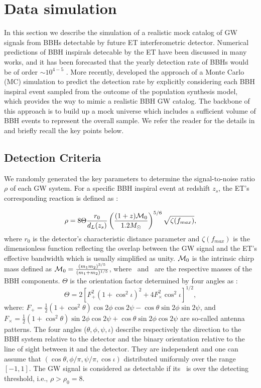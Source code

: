 \documentclass[twocolumn]{aastex62}
\begin{document}
\section{Data simulation} \label{sec_simulation}
In this section we describe the simulation of a realistic mock catalog of GW signals from BBHs detectable by future ET interferometric detector. Numerical predictions of BBH inspirals detecable by the ET 
have been discussed in many works, and it has been forecasted that the yearly detection rate of BBHs would be of order $\sim10^{4-5}$ \citep{Abernathy2011, Ola2013, Biesiada2014}. More recently, \citet{Yang2019} developed the approach of a Monte Carlo (MC) simulation to predict the detection rate by explicitly considering each BBH inspiral event sampled from the outcome of the population synthesis model, which provides the way to mimic a realistic BBH GW catalog. The backbone of this approach is to build up a mock universe which includes a sufficient volume of BBH events to represent the overall sample. We refer the reader for the details in \citet[][Section 2, therein]{Yang2019}  and briefly recall the key points below.

\subsection{Detection Criteria} \label{subsec_criteria}
We randomly generated the key parameters to determine the signal-to-noise ratio $\rho$ of each GW system. For a specific BBH inspiral event at redshift $z_s$, the ET's corresponding reaction is defined as \citep{Abernathy2011}:

\begin{equation} \label{SNR}
\rho = 8 \Theta \frac{r_0}{d_L(z_s)} \left( \frac{(1+z){\cal M}_0}{1.2 M_{\odot}} \right)^{5/6}
\sqrt {\zeta(f_{max})},
\end{equation}
where $r_0$ is the detector's characteristic distance parameter and $\zeta(f_{max})$ is the dimensionless function reflecting the overlap between the GW signal and the ET's effective bandwidth which is usually simplified as unity. ${\cal M}_0$ is the intrinsic chirp mass defined as $ {\cal M}_0 = \frac{(m_1m_2)^{3/5}}{(m_1+m_2)^{1/5}}$, where \mone\ and \mtwo\ are the
respective masses of the BBH components. $\Theta$ is the orientation factor determined by four angles as \citep{Finn93}:
 \begin{equation} \label{Theta}
 \Theta = 2 [ F_{+}^2(1 + \cos^2{\iota} )^2 + 4 F_{\times}^2 \cos^2{\iota} ]^{1/2},
 \end{equation}
where: $F_{+} = \frac{1}{2} (1 + \cos^2{\theta}) \cos{2\phi} \cos{2 \psi} - \cos{\theta} \sin{2 \phi} \sin{ 2 \psi}$, and
$F_{\times} = \frac{1}{2} (1 + \cos^2{\theta}) \sin{2\phi} \cos{2 \psi} + \cos{\theta} \sin{2 \phi} \cos{ 2 \psi}$ are so-called antenna patterns. The four angles ($\theta, \phi, \psi, \iota$) describe respectively the
direction to the BBH system relative to the detector and the binary orientation relative to the line of sight between it and the detector. 
They are independent and one can assume that $(\cos\theta, \phi/\pi, \psi/\pi, \cos\iota)$ distributed uniformly over the range $[-1, 1]$. The GW signal is considered as detectable if its \snr\ is over the detecting threshold, i.e., $\rho > \rho_0 = 8$.
\end{document}
